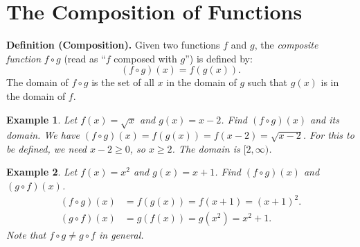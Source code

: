 \documentclass[11pt,a4paper]{article}
\newtheorem{example}{Example}
\begin{document}
\section{The Composition of Functions}
\textbf{Definition (Composition).} Given two functions $f$ and $g$, the \textit{composite function} $f \circ g$ (read as ``$f$ composed with $g$'') is defined by:
\begin{equation*}
(f \circ g)(x) = f(g(x)).
\end{equation*}
The domain of $f \circ g$ is the set of all $x$ in the domain of $g$ such that $g(x)$ is in the domain of $f$.
\begin{example}
Let $f(x) = \sqrt{x}$ and $g(x) = x - 2$. Find $(f \circ g)(x)$ and its domain.
We have $(f \circ g)(x) = f(g(x)) = f(x-2) = \sqrt{x-2}$. For this to be defined, we need $x - 2 \geq 0$, so $x \geq 2$. The domain is $[2, \infty)$.
\end{example}
\begin{example}
Let $f(x) = x^2$ and $g(x) = x + 1$. Find $(f \circ g)(x)$ and $(g \circ f)(x)$.
\begin{align*}
(f \circ g)(x) &= f(g(x)) = f(x + 1) = (x + 1)^2. \\
(g \circ f)(x) &= g(f(x)) = g(x^2) = x^2 + 1.
\end{align*}
Note that $f \circ g \neq g \circ f$ in general.
\end{example}
\end{document}
